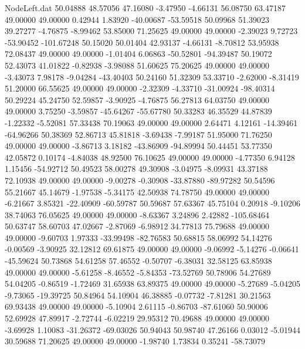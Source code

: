 \begin{filecontents}{NodeLeft.dat}
  50.04888   48.57056   47.16080    -3.47950   -4.66131   56.08750   63.47187   49.00000   49.00000    0.42944    1.83920  -40.00687  -53.59518
  50.09968   51.39023   39.27277    -4.76875   -8.99462   53.85000   71.25625   49.00000   49.00000   -2.39023    9.72723  -53.90452 -101.67248
  50.15020   50.01404   42.93137    -4.66131   -8.70812   53.95938   72.08437   49.00000   49.00000   -1.01404    6.06863  -50.52801  -94.39487
  50.19072   52.43073   41.01822    -0.82938   -3.98088   51.60625   75.20625   49.00000   49.00000   -3.43073    7.98178   -9.04284  -43.40403
  50.24160   51.32309   53.33710    -2.62000   -8.31419   51.20000   66.55625   49.00000   49.00000   -2.32309   -4.33710  -31.00924  -98.40314
  50.29224   45.24750   52.59857    -3.90925   -4.76875   56.27813   64.03750   49.00000   49.00000    3.75250   -3.59857  -45.64267  -55.67780
  50.33283   46.35529   44.87839    -1.22332   -5.52081   57.33438   70.19063   49.00000   49.00000    2.64471    4.12161  -14.39461  -64.96266
  50.38369   52.86713   45.81818    -3.69438   -7.99187   51.95000   71.76250   49.00000   49.00000   -3.86713    3.18182  -43.86909  -94.89994
  50.44451   53.77350   42.05872     0.10174   -4.84038   48.92500   76.10625   49.00000   49.00000   -4.77350    6.94128    1.15456  -54.92712
  50.49523   58.00278   49.30908    -3.04975   -8.09931   43.37188   72.10938   49.00000   49.00000   -9.00278   -0.30908  -33.87880  -89.97282
  50.54596   55.21667   45.14679    -1.97538   -5.34175   42.50938   74.78750   49.00000   49.00000   -6.21667    3.85321  -22.40909  -60.59787
  50.59687   57.63367   45.75104     0.20918   -9.10206   38.74063   76.05625   49.00000   49.00000   -8.63367    3.24896    2.42882 -105.68464
  50.63747   58.60703   47.02667    -2.87069   -6.98912   34.77813   75.79688   49.00000   49.00000   -9.60703    1.97333  -33.99498  -82.76583
  50.68815   58.06992   54.14276    -0.00569   -3.90925   32.12812   69.61875   49.00000   49.00000   -9.06992   -5.14276   -0.06641  -45.59624
  50.73868   54.61258   57.46552    -0.50707   -6.38031   32.58125   63.85938   49.00000   49.00000   -5.61258   -8.46552   -5.84353  -73.52769
  50.78906   54.27689   54.04205    -0.86519   -1.72469   31.65938   63.89375   49.00000   49.00000   -5.27689   -5.04205   -9.73065  -19.39725
  50.84964   54.10904   46.38885    -0.07732   -7.81281   30.21563   69.93438   49.00000   49.00000   -5.10904    2.61115   -0.86703  -87.61060
  50.90006   52.69928   47.89917    -2.72744   -6.02219   29.95312   70.49688   49.00000   49.00000   -3.69928    1.10083  -31.26372  -69.03026
  50.94043   50.98740   47.26166     0.03012   -5.01944   30.59688   71.20625   49.00000   49.00000   -1.98740    1.73834    0.35241  -58.73079

\end{filecontents}
